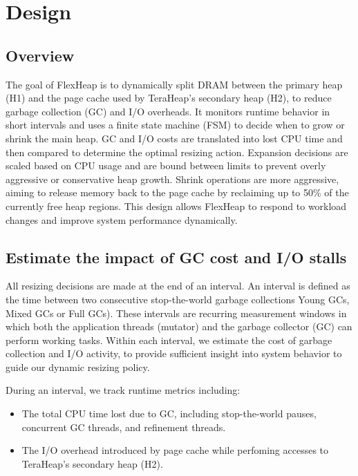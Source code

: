 \section{Design}

\subsection{Overview}

The goal of FlexHeap is to dynamically split DRAM between the primary heap (H1)
and the page cache used by TeraHeap’s secondary heap (H2), to reduce garbage
collection (GC) and I/O overheads. It monitors runtime behavior in short
intervals and uses a finite state machine (FSM) to decide when to grow or
shrink the main heap. GC and I/O costs are translated into lost CPU time and
then compared to determine the optimal resizing action. Expansion decisions are
scaled based on CPU usage and are bound between limits to prevent overly
aggressive or conservative heap growth. Shrink operations are more aggressive,
aiming to release memory back to the page cache by reclaiming up to 50\% of the
currently free heap regions. This design allows FlexHeap to respond to workload
changes and improve system performance dynamically.

\subsection{Estimate the impact of GC cost and I/O stalls}

All resizing decisions are made at the end of an interval. An interval is
defined as the time between two consecutive stop-the-world garbage collections
Young GCs, Mixed GCs or Full GCs). These intervals are recurring measurement windows in which both the
application threads (mutator) and the garbage collector (GC) can perform
working tasks. Within each interval, we estimate the cost of garbage collection and I/O activity,
to provide sufficient insight into system behavior to guide our dynamic resizing policy.

During an interval, we track runtime metrics including:
\begin{itemize}
	\item The total CPU time lost due to GC, including stop-the-world pauses, concurrent GC threads, and refinement threads.
	\item The I/O overhead introduced by page cache while perfoming accesses to TeraHeap's secondary heap (H2).
\end{itemize}


